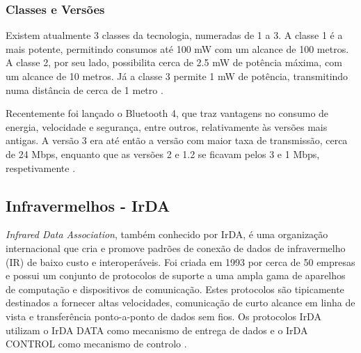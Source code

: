 \documentclass[conference]{IEEEtran}
\begin{document}
\subsubsection{Classes e Versões}

Existem atualmente 3 classes da tecnologia, numeradas de 1 a 3. 
A classe 1 é a mais potente, permitindo consumos até 100 mW com um alcance de 100 metros. 
A classe 2, por seu lado, possibilita cerca de 2.5 mW de potência máxima, com um alcance de 10 metros. 
Já a classe 3 permite 1 mW de potência, transmitindo numa distância de cerca de 1 metro \cite{bluetoothwiki}.

Recentemente foi lançado o Bluetooth 4, que traz vantagens no consumo de energia, velocidade e segurança, entre outros, relativamente às versões mais antigas. A versão 3 era até então a versão com maior taxa de transmissão, cerca de 24 Mbps, enquanto que as versões 2 e 1.2 se ficavam pelos 3 e 1 Mbps, respetivamente \cite{bluetoothwiki}.




\subsection{Infravermelhos - IrDA}

\textit{Infrared Data Association}, também conhecido por IrDA, é uma organização internacional que cria e promove padrões de conexão de dados de infravermelho (IR) de baixo custo e interoperáveis.
Foi criada em 1993 por cerca de 50 empresas e possui um conjunto de protocolos de suporte a uma ampla gama de aparelhos de computação e dispositivos de comunicação. 
Estes protocolos são tipicamente destinados a fornecer altas velocidades, comunicação de curto alcance em linha de vista e transferência ponto-a-ponto de dados sem fios. 
Os protocolos IrDA utilizam o IrDA DATA como mecanismo de entrega de dados e o IrDA CONTROL como mecanismo de controlo \cite{infareddd}.
\end{document}
